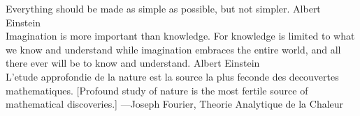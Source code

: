 \thispagestyle{empty}
    \null{}
        \begin{flushright}
                Everything should be made as simple as possible, but
                not simpler. Albert Einstein \\
                Imagination is more important than knowledge. For
                knowledge is limited to what we know and understand
                while imagination embraces the entire world, and all
                there ever will be to know and understand. Albert
                Einstein \\
                L’etude approfondie de la nature est la source la plus
                feconde des decouvertes mathematiques. [Profound study
                of nature is the most fertile source of mathematical
                discoveries.] —Joseph Fourier, Theorie Analytique de
                la Chaleur\\
                
                
        \end{flushright}
        \null

        
